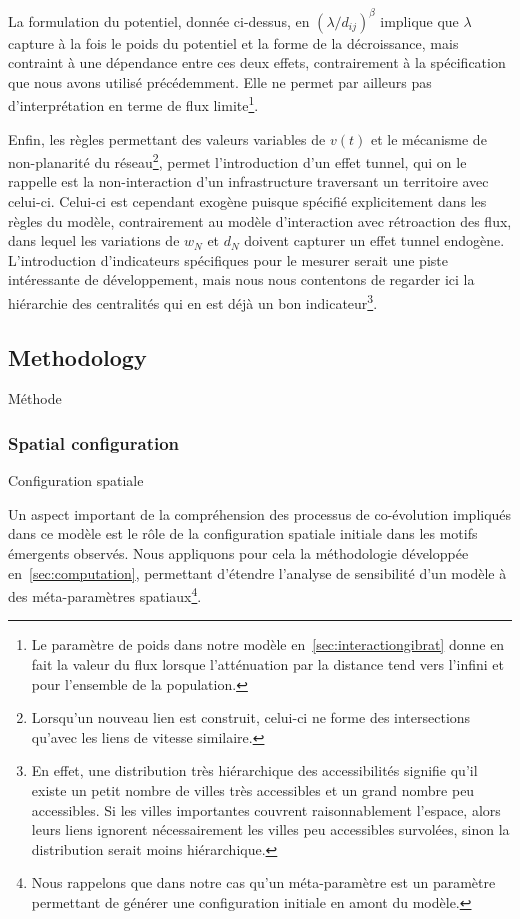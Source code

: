 La formulation du potentiel, donnée ci-dessus, en $(\lambda / d_{ij})^\beta$ implique que $\lambda$ capture à la fois le poids du potentiel et la forme de la décroissance, mais contraint à une dépendance entre ces deux effets, contrairement à la spécification que nous avons utilisé précédemment. Elle ne permet par ailleurs pas d'interprétation en terme de flux limite\footnote{Le paramètre de poids dans notre modèle en~\ref{sec:interactiongibrat} donne en fait la valeur du flux lorsque l'atténuation par la distance tend vers l'infini et pour l'ensemble de la population.}.

Enfin, les règles permettant des valeurs variables de $v(t)$ et le mécanisme de non-planarité du réseau\footnote{Lorsqu'un nouveau lien est construit, celui-ci ne forme des intersections qu'avec les liens de vitesse similaire.}, permet l'introduction d'un effet tunnel, qui on le rappelle est la non-interaction d'un infrastructure traversant un territoire avec celui-ci. Celui-ci est cependant exogène puisque spécifié explicitement dans les règles du modèle, contrairement au modèle d'interaction avec rétroaction des flux, dans lequel les variations de $w_N$ et $d_N$ doivent capturer un effet tunnel endogène. L'introduction d'indicateurs spécifiques pour le mesurer serait une piste intéressante de développement, mais nous nous contentons de regarder ici la hiérarchie des centralités qui en est déjà un bon indicateur\footnote{En effet, une distribution très hiérarchique des accessibilités signifie qu'il existe un petit nombre de villes très accessibles et un grand nombre peu accessibles. Si les villes importantes couvrent raisonnablement l'espace, alors leurs liens ignorent nécessairement les villes peu accessibles survolées, sinon la distribution serait moins hiérarchique.}.



\subsection{Methodology}{Méthode}

\subsubsection{Spatial configuration}{Configuration spatiale}

Un aspect important de la compréhension des processus de co-évolution impliqués dans ce modèle est le rôle de la configuration spatiale initiale dans les motifs émergents observés. Nous appliquons pour cela la méthodologie développée en~\ref{sec:computation}, permettant d'étendre l'analyse de sensibilité d'un modèle à des méta-paramètres spatiaux\footnote{Nous rappelons que dans notre cas qu'un méta-paramètre est un paramètre permettant de générer une configuration initiale en amont du modèle.}.

